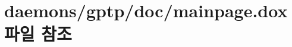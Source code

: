 \hypertarget{gptp_2doc_2mainpage_8dox}{}\section{daemons/gptp/doc/mainpage.dox 파일 참조}
\label{gptp_2doc_2mainpage_8dox}
